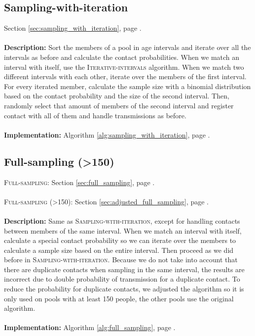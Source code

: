 \begin{appendices}
\subsection{Sampling-with-iteration}
Section \ref{sec:sampling_with_iteration}, page \pageref{sec:sampling_with_iteration}.
\\\\
\textbf{Description:} Sort the members of a pool in age intervals and iterate over all the intervals as before and calculate the contact probabilities. When we match an interval with itself, use the \textsc{Iterative-intervals} algorithm. When we match two different intervals with each other, iterate over the members of the first interval. For every iterated member, calculate the sample size with a binomial distribution based on the contact probability and the size of the second interval. Then, randomly select that amount of members of the second interval and register contact with all of them and handle transmissions as before.
\\\\
\textbf{Implementation:} Algorithm \ref{alg:sampling_with_iteration}, page \pageref{alg:sampling_with_iteration}.

\subsection{Full-sampling (>150)}
\textsc{Full-sampling}: Section \ref{sec:full_sampling}, page \pageref{sec:full_sampling}.
\\\\
\textsc{Full-sampling (>150)}: Section \ref{sec:adjusted_full_sampling}, page \pageref{sec:adjusted_full_sampling}.
\\\\
\textbf{Description:} Same as \textsc{Sampling-with-iteration}, except for handling contacts between members of the same interval. When we match an interval with itself, calculate a special contact probability so we can iterate over the members to calculate a sample size based on the entire interval. Then proceed as we did before in \textsc{Sampling-with-iteration}. Because we do not take into account that there are duplicate contacts when sampling in the same interval, the results are incorrect due to double probability of transmission for a duplicate contact. To reduce the probability for duplicate contacts, we adjusted the algorithm so it is only used on pools with at least 150 people, the other pools use the original algorithm.
\\\\
\textbf{Implementation:} Algorithm \ref{alg:full_sampling}, page \pageref{alg:full_sampling}.


\end{appendices}
